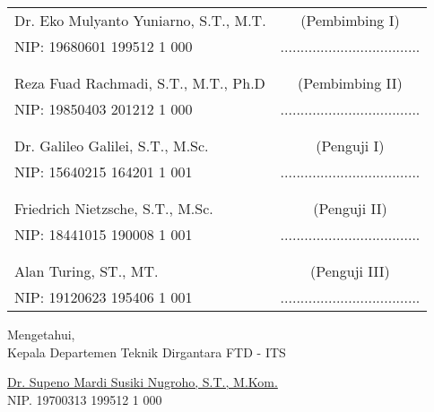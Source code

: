     \noindent
    \begin{tabularx}{\textwidth}{X c}
      Dr. Eko Mulyanto Yuniarno, S.T., M.T.		& (Pembimbing I) \\
      NIP: 19680601 199512 1 000        		& ................................... \\
      &  \\
      &  \\
      Reza Fuad Rachmadi, S.T., M.T., Ph.D		& (Pembimbing II) \\
      NIP: 19850403 201212 1 000        		& ................................... \\
      &  \\
      &  \\
      Dr. Galileo Galilei, S.T., M.Sc.  		& (Penguji I) \\
      NIP: 15640215 164201 1 001       			& ................................... \\
      &  \\
      &  \\
      Friedrich Nietzsche, S.T., M.Sc.  		& (Penguji II) \\
      NIP: 18441015 190008 1 001       			& ................................... \\
      &  \\
      &  \\
      Alan Turing, ST., MT.             		& (Penguji III) \\
      NIP: 19120623 195406 1 001        		& ................................... \\
    \end{tabularx}
  \endgroup

  \vspace{2ex}

  \begin{center}
    Mengetahui, \\
    Kepala Departemen Teknik Dirgantara FTD - ITS \\

    \vspace{8ex}

    \underline{Dr. Supeno Mardi Susiki Nugroho, S.T., M.Kom.} \\
    NIP. 19700313 199512 1 000
  \end{center}
\endgroup
